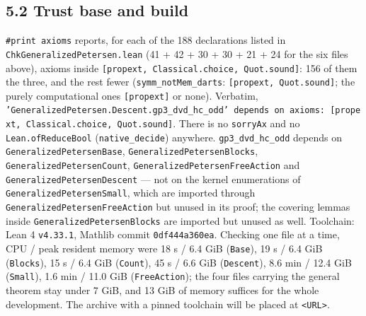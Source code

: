 \documentclass[11pt,a4paper]{article}
\theoremstyle{named}
\begin{document}
\subsection*{5.2 Trust base and build}
\texttt{\#print\ \allowbreak{}axioms} reports, for each of the 188 declarations listed in \texttt{ChkGeneralizedPetersen.\allowbreak{}lean} (41 + 42 + 30 + 30 + 21 + 24 for the six files above), axioms inside \texttt{[propext,\ \allowbreak{}Classical.\allowbreak{}choice,\ \allowbreak{}Quot.\allowbreak{}sound]}: 156 of them the three, and the rest fewer (\texttt{symm\_\allowbreak{}notMem\_\allowbreak{}darts}: \texttt{[propext,\ \allowbreak{}Quot.\allowbreak{}sound]}; the purely computational ones \texttt{[propext]} or none). Verbatim, \texttt{'GeneralizedPetersen.\allowbreak{}Descent.\allowbreak{}gp3\_\allowbreak{}dvd\_\allowbreak{}hc\_\allowbreak{}odd'\ \allowbreak{}depends\ \allowbreak{}on\ \allowbreak{}axioms:\ \allowbreak{}[propext,\ \allowbreak{}Classical.\allowbreak{}choice,\ \allowbreak{}Quot.\allowbreak{}sound]}. There is no \texttt{sorryAx} and no \texttt{Lean.\allowbreak{}ofReduceBool} (\texttt{native\_\allowbreak{}decide}) anywhere. \texttt{gp3\_\allowbreak{}dvd\_\allowbreak{}hc\_\allowbreak{}odd} depends on \texttt{GeneralizedPetersenBase}, \texttt{GeneralizedPetersenBlocks}, \texttt{GeneralizedPetersenCount}, \texttt{GeneralizedPetersenFreeAction} and \texttt{GeneralizedPetersenDescent} — not on the kernel enumerations of \texttt{GeneralizedPetersenSmall}, which are imported through \texttt{GeneralizedPetersenFreeAction} but unused in its proof; the covering lemmas inside \texttt{GeneralizedPetersenBlocks} are imported but unused as well. Toolchain: Lean 4 \texttt{v4.\allowbreak{}33.\allowbreak{}1}, Mathlib commit \texttt{0df444a360ea}. Checking one file at a time, CPU / peak resident memory were 18 s / 6.4 GiB (\texttt{Base}), 19 s / 6.4 GiB (\texttt{Blocks}), 15 s / 6.4 GiB (\texttt{Count}), 45 s / 6.6 GiB (\texttt{Descent}), 8.6 min / 12.4 GiB (\texttt{Small}), 1.6 min / 11.0 GiB (\texttt{FreeAction}); the four files carrying the general theorem stay under 7 GiB, and 13 GiB of memory suffices for the whole development. The archive with a pinned toolchain will be placed at \texttt{\textless{}URL\textgreater{}}.
\end{document}
